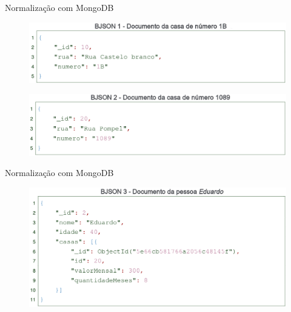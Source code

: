 \documentclass{beamer} %
\begin{document}
\begin{frame}{Normalização com MongoDB}
    \begin{figure}
        \centering
        \includegraphics[width=\linewidth]{imagens/casa-1b.png}
        \label{fig:casa-1b}
    \end{figure}
    
    \begin{figure}
        \centering
        \includegraphics[width=\linewidth]{imagens/casa-1089.png}
        \label{fig:casa-1089}
    \end{figure}
\end{frame}

\begin{frame}{Normalização com MongoDB}
    \begin{figure}
        \centering
        \includegraphics[width=\linewidth]{imagens/pessoa-eduardo.png}
        \label{fig:pessoa-eduardo}
    \end{figure}
\end{frame}
\end{document}
